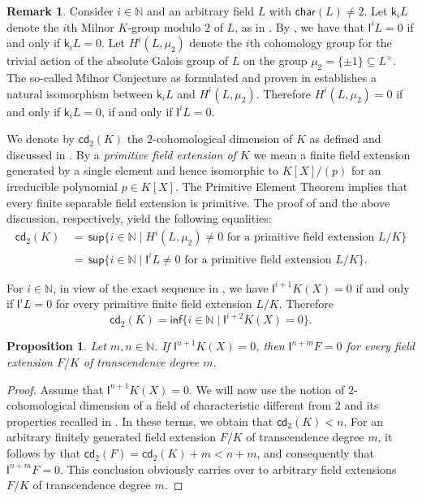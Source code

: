 \documentclass[12pt,leqno]{amsart}
\newcommand{\nat}{\mathbb{N}}
\newcommand{\K}{\mathsf{k}}
\newcommand{\mg}[1]{#1^{\times}}
\renewcommand{\inf}{\mathsf{inf}}
\renewcommand{\sup}{\mathsf{sup}}
\newcommand{\car}{\mathsf{char}}
\newcommand{\I}{\mathsf{I}}
\newcommand{\ctd}{\mathsf{cd}_2}
\numberwithin{equation}{section}
\newtheorem{prop}[equation]{Proposition}
\theoremstyle{definition}
\newtheorem{rem}[equation]{Remark}
\theoremstyle{plain}
\begin{document}
\begin{rem}\label{R:cd2}
Consider $i\in\nat$ and an arbitrary field $L$ with $\car(L)\neq 2$.
Let $\K_iL$ denote the $i$th Milnor $K$-group modulo $2$ of $L$, as in \cite{EL72k}.
By \cite[Cor.~3.3]{EL72k}, we have that $\I^iL=0$ if and only if $\K_iL=0$.
Let $H^i(L,\mu_2)$ denote the $i$th cohomology group for the trivial action of the absolute Galois group of $L$ on the group $\mu_2=\{\pm 1\}\subseteq \mg L$. 
The so-called Milnor Conjecture as formulated and proven in \cite{Voe03} establishes a natural isomorphism between
$\K_iL$ and $H^i(L,\mu_2)$.
Therefore $H^i(L,\mu_2)=0$  if and only if  $\K_iL=0$,  if and only if $\I^i L=0$.

We denote by $\ctd(K)$ the $2$-cohomological dimension  of $K$ as defined and discussed in \cite[Section 6.5]{NSW08}.
By a \emph{primitive field extension of $K$} we mean a finite field extension generated by a single element and hence isomorphic to $K[X]/(p)$ for an irreducible polynomial $p\in K[X]$. 
The Primitive Element Theorem implies that every finite separable field extension is primitive.
The proof of \cite[Prop.~6.5.11]{NSW08} and the above discussion, respectively, yield the following equalities:
\begin{align*}
    \ctd(K) &\, =\,  \sup\{i\in\nat\mid H^i(L,\mu_2)\neq 0\mbox{ for a primitive field extension $L/K$}\}\\
    & \, = \, \sup\{i\in\nat\mid \I^i L\neq 0\mbox{ for a primitive field extension $L/K$}\}.
\end{align*}

For $i\in\nat$, in view of the exact sequence in \cite[Cor.~21.3]{EKM08}, we have $\I^{i+1}K(X)=0$ if and only if 
$\I^iL=0$ for every primitive finite field extension $L/K$.
Therefore 
\[\ctd(K)  =  \inf\{i\in\nat\mid \I^{i+2}K(X) = 0\}.\]
\end{rem}

\begin{prop}\label{cd2substitute}
Let $m,n\in\nat$.
If $\I^{n+1}K(X)=0$, then $\I^{n+m}F=0$ for every field extension $F/K$ of transcendence degree $m$.
\end{prop}
\begin{proof}
Assume that $\I^{n+1}K(X)=0$. 
We will now use the notion of $2$-cohomological dimension of a field of characteristic different from $2$ and its properties recalled in . In these terms, we obtain that $\ctd(K)< n$.
For an arbitrary finitely generated field extension $F/K$ of transcendence degree $m$, it follows by \cite[Theorem 6.5.14]{NSW08} that $\ctd(F)= \ctd(K)+m<n+m$, and consequently that $\I^{n+m}F=0$.
This conclusion obviously carries over to arbitrary field extensions $F/K$ of transcendence degree $m$.
\end{proof}
\end{document}
